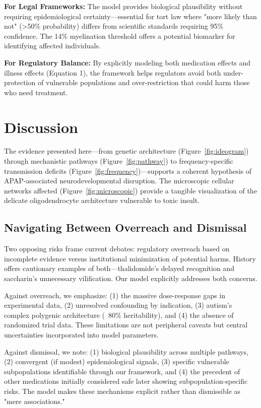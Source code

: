 \documentclass[11pt]{article}
\let\oldsection\section
\renewcommand{\section}[1]{\oldsection{#1}\setlength{\leftskip}{0em}}
\let\oldsubsection\subsection
\renewcommand{\subsection}[1]{\oldsubsection{#1}\setlength{\leftskip}{0.75em}}
\begin{document}
\textbf{For Legal Frameworks:} The model provides biological plausibility without requiring epidemiological certainty—essential for tort law where "more likely than not" (>50\% probability) differs from scientific standards requiring 95\% confidence. The 14\% myelination threshold offers a potential biomarker for identifying affected individuals.

\textbf{For Regulatory Balance:} By explicitly modeling both medication effects and illness effects (Equation 1), the framework helps regulators avoid both under-protection of vulnerable populations and over-restriction that could harm those who need treatment.

\section{Discussion}
The evidence presented here—from genetic architecture (Figure~\ref{fig:ideogram}) through mechanistic pathways (Figure~\ref{fig:pathway}) to frequency-specific transmission deficits (Figure~\ref{fig:frequency})—supports a coherent hypothesis of APAP-associated neurodevelopmental disruption. The microscopic cellular networks affected (Figure~\ref{fig:microscopic}) provide a tangible visualization of the delicate oligodendrocyte architecture vulnerable to toxic insult.

\subsection{Navigating Between Overreach and Dismissal}

Two opposing risks frame current debates: regulatory overreach based on incomplete evidence versus institutional minimization of potential harms. History offers cautionary examples of both—thalidomide's delayed recognition and saccharin's unnecessary vilification. Our model explicitly addresses both concerns.

Against overreach, we emphasize: (1) the massive dose-response gaps in experimental data, (2) unresolved confounding by indication, (3) autism's complex polygenic architecture (~80\% heritability), and (4) the absence of randomized trial data. These limitations are not peripheral caveats but central uncertainties incorporated into model parameters.

Against dismissal, we note: (1) biological plausibility across multiple pathways, (2) convergent (if modest) epidemiological signals, (3) specific vulnerable subpopulations identifiable through our framework, and (4) the precedent of other medications initially considered safe later showing subpopulation-specific risks. The model makes these mechanisms explicit rather than dismissible as "mere associations."
\end{document}
